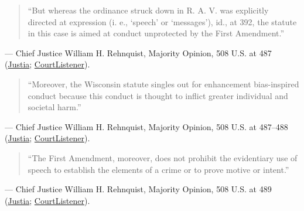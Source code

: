 \documentclass[12pt]{article}
\begin{document}
\begin{quote}
``But whereas the ordinance struck down in R. A. V. was explicitly directed at expression (i. e., `speech' or `messages'), id., at 392, the statute in this case is aimed at conduct unprotected by the First Amendment.''
\end{quote}
\noindent --- Chief Justice William H. Rehnquist, Majority Opinion, 508 U.S. at 487 (\href{https://supreme.justia.com/cases/federal/us/508/476/}{Justia}; \href{https://www.courtlistener.com/opinion/112879/wisconsin-v-mitchell/}{CourtListener}).

\begin{quote}
``Moreover, the Wisconsin statute singles out for enhancement bias-inspired conduct because this conduct is thought to inflict greater individual and societal harm.''
\end{quote}
\noindent --- Chief Justice William H. Rehnquist, Majority Opinion, 508 U.S. at 487--488 (\href{https://supreme.justia.com/cases/federal/us/508/476/}{Justia}; \href{https://www.courtlistener.com/opinion/112879/wisconsin-v-mitchell/}{CourtListener}).

\begin{quote}
``The First Amendment, moreover, does not prohibit the evidentiary use of speech to establish the elements of a crime or to prove motive or intent.''
\end{quote}
\noindent --- Chief Justice William H. Rehnquist, Majority Opinion, 508 U.S. at 489 (\href{https://supreme.justia.com/cases/federal/us/508/476/}{Justia}; \href{https://www.courtlistener.com/opinion/112879/wisconsin-v-mitchell/}{CourtListener}).
\end{document}
